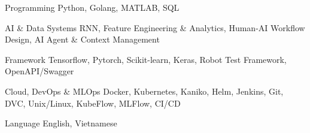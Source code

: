 

\begin{cvskills}

  \cvskill
    {Programming} %
    {Python, Golang, MATLAB, SQL} %

  \cvskill
    {AI \& Data Systems} %
    {RNN, Feature Engineering \& Analytics, Human-AI Workflow Design, AI Agent \& Context Management} %

  \cvskill
    {Framework} %
    {Tensorflow, Pytorch, Scikit-learn, Keras, Robot Test Framework, OpenAPI/Swagger} %

  \cvskill
    {Cloud, DevOps \& MLOps} %
    {Docker, Kubernetes, Kaniko, Helm, Jenkins, Git, DVC, Unix/Linux, 
    KubeFlow, MLFlow, CI/CD} %
    
  \cvskill
    {Language} %
    {English, Vietnamese}

\end{cvskills}
